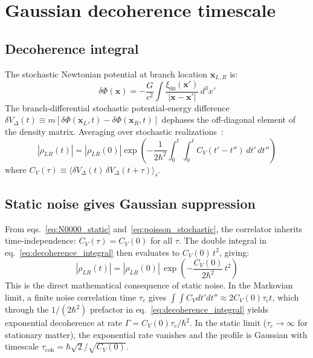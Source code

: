 \documentclass[12pt,a4paper]{article}
\theoremstyle{remark}
\begin{document}
\section{Gaussian decoherence timescale}
\label{sec:gaussian}

\subsection{Decoherence integral}

The stochastic Newtonian potential at branch location $\mathbf{x}_{L,R}$ is:
\begin{equation}
\delta\Phi(\mathbf{x}) = -\frac{G}{c^2}\int \frac{\xi_{00}(\mathbf{x}')}{|\mathbf{x}-\mathbf{x}'|}\,d^3x'
\end{equation}
The branch-differential stochastic potential-energy difference $\delta V_\Delta(t) \equiv m[\delta\Phi(\mathbf{x}_L,t) - \delta\Phi(\mathbf{x}_R,t)]$ dephases the off-diagonal element of the density matrix. Averaging over stochastic realizations~\cite{hu_verdaguer}:
\begin{equation}
|\rho_{LR}(t)| = |\rho_{LR}(0)|\exp\!\left(-\frac{1}{2\hbar^2}\int_0^t\!\!\int_0^t
C_V(t'-t'')\,dt'\,dt''\right)
\label{eq:decoherence_integral}
\end{equation}
where $C_V(\tau) \equiv \langle\delta V_\Delta(t)\,\delta V_\Delta(t+\tau)\rangle_s$.

\subsection{Static noise gives Gaussian suppression}

From eqs.~\eqref{eq:N0000_static} and~\eqref{eq:poisson_stochastic}, the correlator
inherits time-independence: $C_V(\tau) = C_V(0)$ for all $\tau$. The double integral in
eq.~\eqref{eq:decoherence_integral} then evaluates to $C_V(0)\,t^2$, giving:
\begin{equation}
|\rho_{LR}(t)| = |\rho_{LR}(0)|\,\exp\!\left(-\frac{C_V(0)}{2\hbar^2}\,t^2\right)
\label{eq:gaussian_suppression}
\end{equation}
This is the direct mathematical consequence of static noise. In the Markovian limit, a
finite noise correlation time $\tau_c$ gives $\int\int C_V dt'dt'' \approx 2C_V(0)\tau_c
t$, which through the $1/(2\hbar^2)$ prefactor in eq.~\eqref{eq:decoherence_integral}
yields exponential decoherence at rate $\Gamma = C_V(0)\tau_c/\hbar^2$. In the
static limit ($\tau_c\to\infty$ for stationary matter), the exponential rate vanishes and
the profile is Gaussian with timescale $\tau_{\text{coh}} = \hbar\sqrt{2}/\sqrt{C_V(0)}$.
\end{document}
